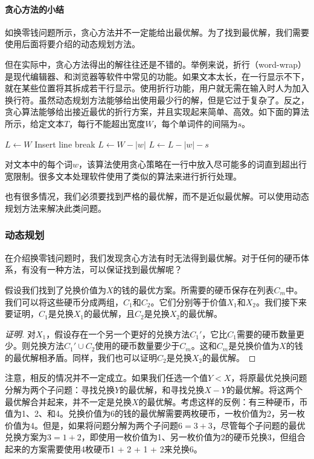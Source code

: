 \documentclass[b5paper]{ctexart}
\begin{document}
\paragraph{贪心方法的小结}

如换零钱问题所示，贪心方法并不一定能给出最优解。为了找到最优解，我们需要使用后面将要介绍的动态规划方法。

但在实际中，贪心方法得出的解往往还是不错的。举例来说，折行（word-wrap）是现代编辑器、和浏览器等软件中常见的功能。如果文本太长，在一行显示不下，就在某些位置将其拆成若干行显示。使用折行功能，用户就无需在输入时人为加入换行符。虽然动态规划方法能够给出使用最少行的解，但是它过于复杂了。反之，贪心算法能够给出接近最优的折行方案，并且实现起来简单、高效。如下面的算法所示，给定文本$T$，每行不能超出宽度$W$，每个单词件的间隔为$s$。

\begin{algorithmic}[1]
\State $L \gets W$
    \State Insert line break
    \State $L \gets W - |w|$
  \Else
    \State $L \gets L - |w| - s$
  \EndIf
\EndFor
\end{algorithmic}

对文本中的每个词$w$，该算法使用贪心策略在一行中放入尽可能多的词直到超出行宽限制。很多文本处理软件使用了类似的算法来进行折行处理。

也有很多情况，我们必须要找到严格的最优解，而不是近似最优解。可以使用动态规划方法来解决此类问题。

\subsubsection{动态规划}

在介绍换零钱问题时，我们发现贪心方法有时无法得到最优解。对于任何的硬币体系，有没有一种方法，可以保证找到最优解呢？

假设我们找到了兑换价值为$X$的钱的最优方案。所需要的硬币保存在列表$C_m$中。我们可以将这些硬币分成两组，$C_1$和$C_2$。它们分别等于价值$X_1$和$X_2$。我们接下来要证明，$C_1$是兑换$X_1$的最优解，且$C_2$是兑换$X_2$的最优解。

\begin{proof}[证明]
对$X_1$，假设存在一个另一个更好的兑换方法$C_1'$，它比$C_1$需要的硬币数量更少。则兑换方法$C_1' \cup C_2$使用的硬币数量要少于$C_m$。这和$C_m$是兑换价值为$X$的钱的最优解相矛盾。同样，我们也可以证明$C_2$是兑换$X_2$的最优解。
\end{proof}

注意，相反的情况并不一定成立。如果我们任选一个值$Y < X$，将原最优兑换问题分解为两个子问题：寻找兑换$Y$的最优解，和寻找兑换$X - Y$的最优解。将这两个最优解合并起来，并不一定是兑换$X$的最优解。考虑这样的反例：有三种硬币，币值为1、2、和4。兑换价值为6的钱的最优解需要两枚硬币，一枚价值为2，另一枚价值为4。但是，如果将问题分解为两个子问题$6 = 3 + 3$，尽管每个子问题的最优兑换方案为$3 = 1 + 2$，即使用一枚价值为1、另一枚价值为2的硬币兑换3，但组合起来的方案需要使用4枚硬币1 + 2 + 1 + 2来兑换6。
\end{document}
